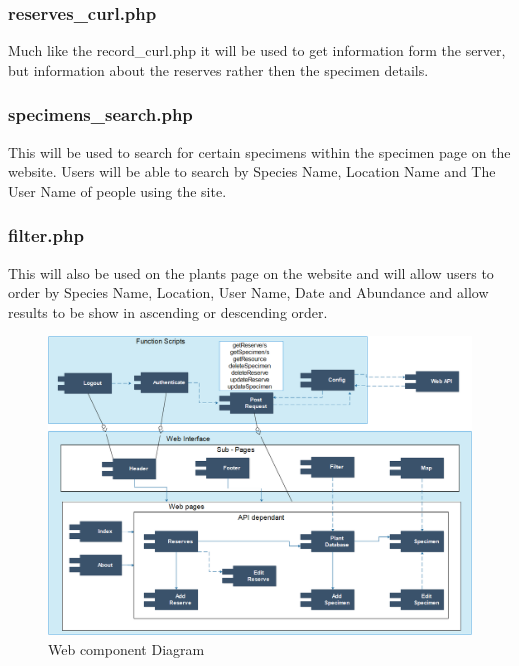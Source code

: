 	\subsubsection{reserves\_curl.php}
		Much like the record\_curl.php it will be used to get information form the server, but information about the reserves rather then the specimen details.

	\subsubsection{specimens\_search.php}
		This will be used to search for certain specimens within the specimen page on the website. Users will be able to search by Species Name, Location Name and The User Name of people using the site.

	\subsubsection{filter.php}
		This will also be used on the plants page on the website and will allow users to order by Species Name, Location, User Name, Date and Abundance and allow results to be show in ascending or descending order.

\begin{landscape}
    \begin{figure}
        \centering
        \includegraphics[scale=1]{web/webComponentDiagram.png}
        \caption{Web component Diagram}
        \label{fig:webComponentDiagram}
    \end{figure}
\end{landscape}


